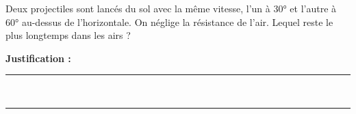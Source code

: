 Deux projectiles sont lancés du sol avec la même vitesse, l'un à \ang{30} et l'autre à \ang{60} au-dessus de l'horizontale. On néglige la résistance de l'air. Lequel reste le plus longtemps dans les airs ?

\choices

\noindent\textbf{Justification :} \hrulefill \\[2.5ex]
\rule{\linewidth}{0.4pt} \\[2.5ex]
\rule{\linewidth}{0.4pt}
\vfill
